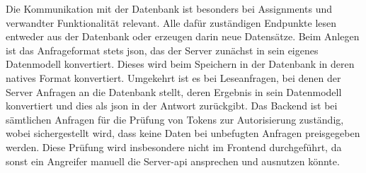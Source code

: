 Die Kommunikation mit der Datenbank ist besonders bei Assignments und verwandter Funktionalität relevant.
Alle dafür zuständigen Endpunkte lesen entweder aus der Datenbank oder erzeugen darin neue Datensätze.
Beim Anlegen ist das Anfrageformat stets \ac{json}, das der Server zunächst in sein eigenes Datenmodell konvertiert.
Dieses wird beim Speichern in der Datenbank in deren natives Format konvertiert.
Umgekehrt ist es bei Leseanfragen, bei denen der Server Anfragen an die Datenbank stellt, deren Ergebnis in sein Datenmodell konvertiert und dies als \ac{json} in der Antwort zurückgibt.
Das Backend ist bei sämtlichen Anfragen für die Prüfung von Tokens zur Autorisierung zuständig, wobei sichergestellt wird, dass keine Daten bei unbefugten Anfragen preisgegeben werden.
Diese Prüfung wird insbesondere nicht im Frontend durchgeführt, da sonst ein Angreifer manuell die Server-\ac{api} ansprechen und ausnutzen könnte.
